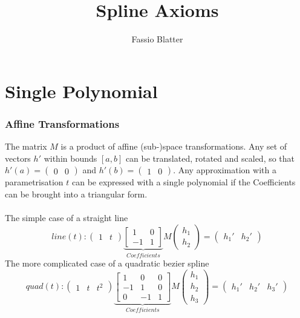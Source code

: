 \documentclass[a4paper,landscape]{report}
\begin{document}
\title{Spline Axioms}
\author{Fassio Blatter}
\maketitle

\chapter{Single Polynomial}

\subsection{Affine Transformations}
The matrix $M$ is a product of affine (sub-)space transformations. Any set of vectors $h'$ within bounds $[a,b]$ can be translated, rotated and scaled, so that $h'(a)=\begin{pmatrix}0 & 0\end{pmatrix}$ and $h'(b)=\begin{pmatrix}1 & 0\end{pmatrix}$. Any approximation with a parametrisation $t$ can be expressed with a single polynomial if the Coefficients can be brought into a triangular form.\\\\
The simple case of a straight line
\begin{equation}
line(t):
\begin{pmatrix}
1 & t
\end{pmatrix}
\underbrace{\begin{bmatrix}
1 & 0\\
-1 & 1
\end{bmatrix}}_{Coefficients}
M
\begin{pmatrix}
h_{1} \\
h_{2}
\end{pmatrix}
=
\begin{pmatrix}
h_{1}' & h_{2}'
\end{pmatrix}
\end{equation}
The more complicated case of a quadratic bezier spline
\begin{equation}
quad(t):
\begin{pmatrix}
1 & t & t^2
\end{pmatrix}
\underbrace{\begin{bmatrix}
1 & 0 & 0\\
-1 & 1 & 0\\
0 & -1 &1
\end{bmatrix}}_{Coefficients}
M
\begin{pmatrix}
h_{1} \\
h_{2} \\
h_{3}
\end{pmatrix}
=
\begin{pmatrix}
h_{1}' & h_{2}' & h_{3}'
\end{pmatrix}
\end{equation}
\end{document}
